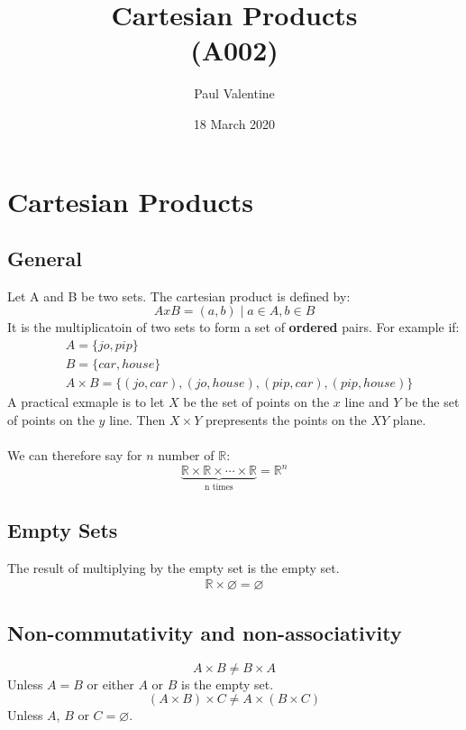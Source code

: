 \documentclass[a4paper]{article}
\title{\textbf{Cartesian Products}\\(A002)}
\author{Paul Valentine}
\date{18 March 2020}
\begin{document}
\maketitle%
\section{Cartesian Products}
\subsection{General}
Let A and B be two sets. The cartesian product is defined by:
\begin{equation}
AxB = {(a,b)\mid a\in A, b\in B}
\end{equation}
It is the multiplicatoin of two sets to form a set of \textbf{ordered} pairs. For example if:
\begin{align*}
&A=\{ jo, pip \}\\
&B = \{car, house\}\\
&A\times B = \{(jo,car),(jo,house),(pip,car),(pip,house)\}
\end{align*}
A practical exmaple is to let $X$ be the set of points on the $x$ line and $Y$ be the set of points on the $y$ line. Then $X \times Y$ prepresents the points on the $XY$ plane.\\ \\
We can therefore say for $n$ number of $\mathbb{R}$:
\begin{equation}
\underbrace{\mathbb{R} \times \mathbb{R} \times \cdots \times \mathbb{R}}_{\text{n times}}=\mathbb{R}^n
\end{equation}
\subsection{Empty Sets}
The result of multiplying by the empty set is the empty set.
\begin{align}
  \mathbb{R} \times \varnothing = \varnothing
\end{align}
\subsection{Non-commutativity and non-associativity}
\begin{equation}
  A \times B \neq B \times A
\end{equation}
Unless $A=B$ or either $A$ or $B$ is the empty set.
\begin{equation}
  (A \times B) \times C \neq A \times (B \times C)
\end{equation}
Unless $A$, $B$ or $C =\varnothing$.
\end{document}
